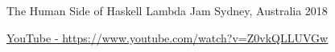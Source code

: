 


\begin{cventries}


\cventry
{The Human Side of Haskell} %
{Lambda Jam} %
{Sydney, Australia} %
{2018} %
{ %
\begin{cvitems}
\item { \color{awesome-nephritis} \href{https://www.youtube.com/watch?v=Z0vkQLLUVGw}{\faExternalLinkSquare \acvHeaderIconSep YouTube - https://www.youtube.com/watch?v=Z0vkQLLUVGw} }
\end{cvitems}
}


\end{cventries}